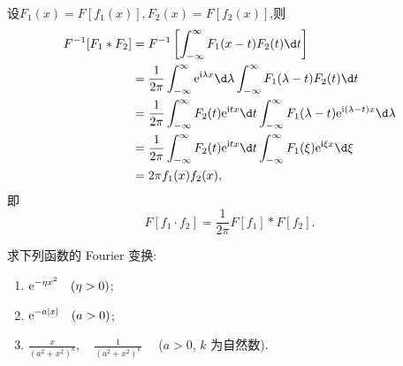 \begin{note}
	设$F_1(x)=F[f_1(x)],F_2(x)=F[f_2(x)]$,则
	\[\begin{aligned}
		F^{-1}[F_1*F_2]&=F^{-1}\left[\int_{-\infty}^{\infty}F_1(x-t)F_2(t)\d t\right]\\
		&=\frac{1}{2\pi}\int_{-\infty}^{\infty}\e^{\upi\lambda x}\d\lambda\int_{-\infty}^{\infty}F_1(\lambda-t)F_2(t)\d t\\
		&=\frac{1}{2\pi}\int_{-\infty}^{\infty}F_2(t)\e^{\upi tx}\d t\int_{-\infty}^{\infty}F_1(\lambda-t)\e^{\upi(\lambda-t)x}\d\lambda\\
		&=\frac{1}{2\pi}\int_{-\infty}^{\infty}F_2(t)\e^{\upi tx}\d t\int_{-\infty}^{\infty}F_1(\xi)\e^{\upi\xi x}\d\xi\\
		&=2\pi f_1(x)f_2(x),
	\end{aligned}
	\]
	即
	\[F[f_1\cdot f_2]=\frac{1}{2\pi}F[f_1]*F[f_2].\]
\end{note}
\begin{exercise}
  求下列函数的 Fourier 变换:
  \begin{enumerate}[(1),left=\parindent]
    \item $\displaystyle\mathrm{e}^{-\eta x^2}\quad(\eta>0)$;
    \item $\displaystyle\mathrm{e}^{-a|x|}\quad(a>0)$;
    \item $\displaystyle\frac{x}{(a^2+x^2)^k},\quad\displaystyle\frac{1}{(a^2+x^2)^k}\quad$ ($a>0$, $k$ 为自然数).
  \end{enumerate}
\end{exercise}

